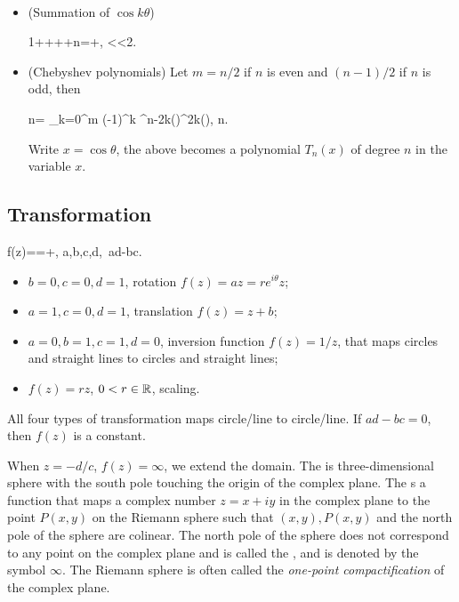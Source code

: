\documentclass[10pt,a4paper]{book}
\begin{document}
\begin{exbox}
\begin{example}\
	\begin{itemize}
		\item (Summation of $\cos k\theta$)
		\begin{sequation*}
			1+\cos\theta+\theta+\cdots+\cos n\theta=+, <\theta<2\pi.
		\end{sequation*}
		\item (Chebyshev polynomials) Let $m=n/2$ if $n$ is even and $(n-1)/2$ if $n$ is odd, then    
		\begin{sequation*}
			\cos n\theta = \sum_{k=0}^{m} (-1)^k \cos^{n-2k}(\theta)\sin^{2k}(\theta), \quad n\in\bbN.
		\end{sequation*}
		 Write $x=\cos\theta$, the above becomes a polynomial $T_n(x)$ of degree $n$ in the variable $x$.   
	\end{itemize}
	
\end{example}
\end{exbox}

\subsection{Transformation}\label{sec:complex-trans}
\underline{} 
\begin{sequation*}
	f(z)==+, \quad a,b,c,d\in\bbC,\ ad-bc.
\end{sequation*}
\begin{itemize}
	\item $b=0,c=0,d=1$, rotation $f(z)=az=re^{i\theta}z$;
	\item $a=1,c=0,d=1$, translation $f(z)=z+b$;
	\item $a=0,b=1,c=1,d=0$, inversion function $f(z)=1/z$, that maps circles and straight lines to circles and straight lines;
	\item $f(z)=rz$, $0<r\in\mathbb R$, scaling.  
\end{itemize}  
All four types of transformation maps circle/line to circle/line.
If $ad-bc=0$, then $f(z)$ is a constant.

When $z=-d/c$, $f(z)=\infty $, we extend the domain.
The  is three-dimensional sphere with the south pole
touching the origin of the complex plane. The  s a function that
maps a complex number $z=x+iy$ in the complex plane to the point $P(x,y)$ on the Riemann
sphere such that $(x,y),P(x,y)$ and the north pole of the sphere are colinear. The north
pole of the sphere does not correspond to any point on the complex plane and is called the , and is denoted by the symbol $\infty $. The Riemann sphere is often called the \textit{one-point compactification} of the complex plane.
\end{document}
